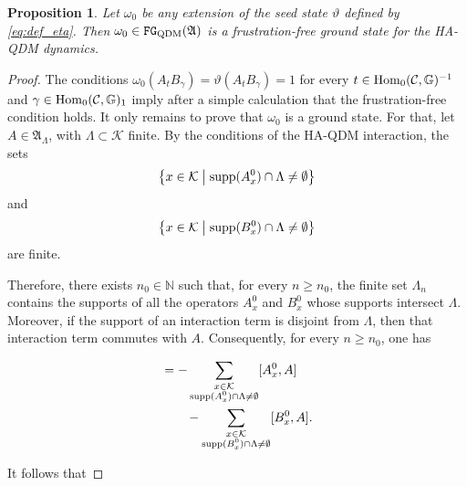 \documentclass[a4paper,12pt,twoside,reqno]{amsart}
\theoremstyle{plain}
\newtheorem{prop}[teo]{Proposition}
\theoremstyle{definition}
\theoremstyle{remark}
\numberwithin{equation}{section}
\numberwithin{figure}{section}
\numberwithin{table}{section}
\newcommand{\f}[1]{\mathcal{#1}}
\newcommand{\n}[1]{\mathbb{#1}}
\begin{document}
	
	
	
	
	\begin{prop}\label{prop:Exixst}
		Let $\omega_0$ be any extension of the seed state $\vartheta$ defined by \eqref{eq:def_eta}. Then $\omega_0\in\mathtt{FG}_{\rm QDM}(\mathfrak{A})$ is a frustration-free ground state for  the {HA-QDM dynamics}.
	\end{prop}%
	\begin{proof}
		The conditions $\omega_0(A_tB_\gamma)=\vartheta(A_tB_\gamma)=1$  for every $t\in {\rm Hom}_0(\f{C},\n{G})^{-1}$ and $\gamma\in {\rm Hom}_0(\f{C},\n{G})_1$ imply after a simple calculation that the frustration-free condition holds. It only remains to prove that $\omega_0$ is a ground state. For that,
		let $A\in\mathfrak{A}_\Lambda$, with $\Lambda\subset\f{K}$ finite.
		By the conditions of the HA-QDM interaction, the sets
		\[
		\left\{
		x\in\f{K}\;\middle|\;
		{\rm supp}(A_x^0)\cap\Lambda\neq\emptyset
		\right\}
		\]
		and
		\[
		\left\{
		x\in\f{K}\;\middle|\;
		{\rm supp}(B_x^0)\cap\Lambda\neq\emptyset
		\right\}
		\]
		are finite.
		
		Therefore, there exists $n_0\in\n{N}$ such that, for every
		$n\geqslant n_0$, the finite set $\Lambda_n$ contains the supports
		of all the operators $A_x^0$ and $B_x^0$ whose supports intersect
		$\Lambda$. Moreover, if the support of an interaction term is
		disjoint from $\Lambda$, then that interaction term commutes with
		$A$. Consequently, for every $n\geqslant n_0$, one has
		
		\begin{align*}
			[H_{\rm QDM}^{\Lambda_n},A]
			&=
			-\sum_{\substack{x\in\f{K}\\
					{\rm supp}(A_x^0)\cap\Lambda\neq\emptyset}}
			[A_x^0,A]
			\\
			&\qquad
			-\sum_{\substack{x\in\f{K}\\
					{\rm supp}(B_x^0)\cap\Lambda\neq\emptyset}}
			[B_x^0,A].
		\end{align*}
		
		It follows that
		

\end{proof}
\end{document}

